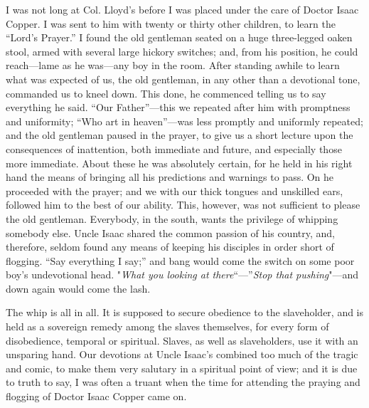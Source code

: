 I was not long at Col. Lloyd's before I was placed under the care of
Doctor Isaac Copper. I was sent to him with twenty or thirty other
children, to learn the ``Lord's Prayer.'' I found the old gentleman
seated on a huge three-legged oaken stool, armed with several large
hickory switches; and, from his position, he could reach---lame as he
was---any boy in the room. After standing awhile to learn what was
expected of us, the old gentleman, in any other than a devotional tone,
commanded us to kneel down. This done, he commenced telling us to say
everything he said. ``Our Father''---this we repeated after him with
promptness and uniformity; ``Who art in heaven''---was less promptly and
uniformly repeated; and the old gentleman paused in the prayer, to give
us a short lecture upon the consequences of inattention, both immediate
and future, and especially those more immediate. About these he was
absolutely certain, for he held in his right hand the means of
{}bringing all his predictions and warnings to pass. On he proceeded
with the prayer; and we with our thick tongues and unskilled ears,
followed him to the best of our ability. This, however, was not
sufficient to please the old gentleman. Everybody, in the south, wants
the privilege of whipping somebody else. Uncle Isaac shared the common
passion of his country, and, therefore, seldom found any means of
keeping his disciples in order short of flogging. ``Say everything I
say;'' and bang would come the switch on some poor boy's undevotional
head. "\emph{What you looking at there}``---''\emph{Stop that
pushing}"---and down again would come the lash.

The whip is all in all. It is supposed to secure obedience to the
slaveholder, and is held as a sovereign remedy among the slaves
themselves, for every form of disobedience, temporal or spiritual.
Slaves, as well as slaveholders, use it with an unsparing hand. Our
devotions at Uncle Isaac's combined too much of the tragic and comic, to
make them very salutary in a spiritual point of view; and it is due to
truth to say, I was often a truant when the time for attending the
praying and flogging of Doctor Isaac Copper came on.

